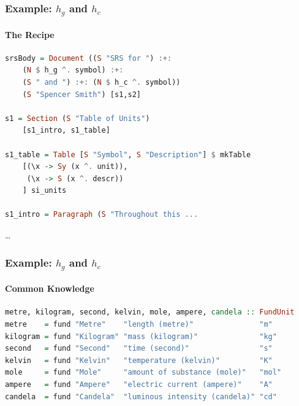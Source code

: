 \documentclass{beamer}
\begin{document}
\begin{frame}[fragile]

\frametitle{Example: $h_g$ and $h_c$}

\framesubtitle{The Recipe}


\begin{lstlisting}[language=Haskell, frame=single, showstringspaces=false, basicstyle=\scriptsize]
srsBody = Document ((S "SRS for ") :+: 
    (N $ h_g ^. symbol) :+: 
    (S " and ") :+: (N $ h_c ^. symbol)) 
    (S "Spencer Smith") [s1,s2]

s1 = Section (S "Table of Units") 
    [s1_intro, s1_table]

s1_table = Table [S "Symbol", S "Description"] $ mkTable
    [(\x -> Sy (x ^. unit)),
     (\x -> S (x ^. descr))
    ] si_units

s1_intro = Paragraph (S "Throughout this ...
\end{lstlisting} 
\LARGE{\ldots}


\end{frame}


\begin{frame}[fragile]
\frametitle{Example: $h_g$ and $h_c$}
\framesubtitle{Common Knowledge}


\begin{lstlisting}[language=Haskell, frame=single, showstringspaces=false, basicstyle=\tiny]
metre, kilogram, second, kelvin, mole, ampere, candela :: FundUnit
metre    = fund "Metre"    "length (metre)"               "m"
kilogram = fund "Kilogram" "mass (kilogram)"              "kg"
second   = fund "Second"   "time (second)"                "s"
kelvin   = fund "Kelvin"   "temperature (kelvin)"         "K"
mole     = fund "Mole"     "amount of substance (mole)"   "mol"
ampere   = fund "Ampere"   "electric current (ampere)"    "A"
candela  = fund "Candela"  "luminous intensity (candela)" "cd"
\end{lstlisting}


\end{frame}
\end{document}
